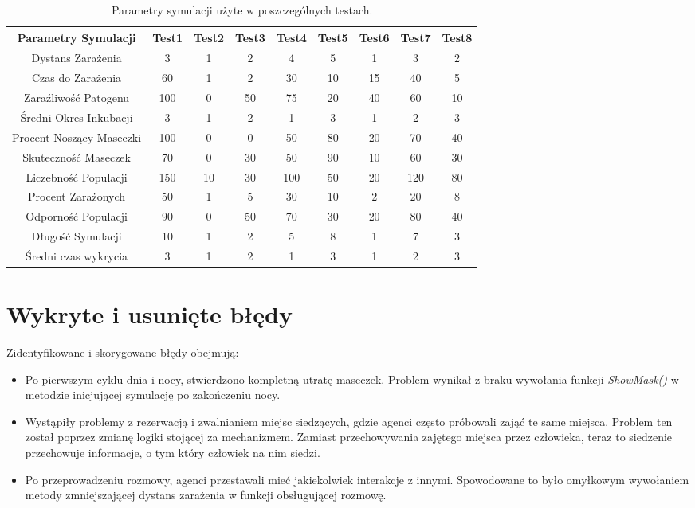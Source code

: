 \begin{table}[h!]
	\caption{Parametry symulacji użyte w poszczególnych testach.}
	\centering
	\begin{tabular}{|c|c|c|c|c|c|c|c|c|}
		\hline
		\textbf{Parametry Symulacji} & \textbf{Test1} & \textbf{Test2}  & \textbf{Test3}  & \textbf{Test4}  & \textbf{Test5} & \textbf{Test6} & \textbf{Test7} & \textbf{Test8}  \\
		\hline
		Dystans Zarażenia & 3 & 1 & 2 & 4 & 5 & 1 & 3 & 2\\
		\hline
		Czas do Zarażenia & 60 &  1 & 2 & 30 & 10 & 15 & 40 & 5\\
		\hline
		Zaraźliwość Patogenu & 100  & 0 & 50 & 75 & 20 & 40 & 60 & 10\\
		\hline
		Średni Okres Inkubacji & 3 & 1 & 2 & 1 & 3 & 1 & 2 & 3\\
		\hline
		Procent Noszący Maseczki & 100 & 0 & 0 & 50 & 80 & 20 & 70 & 40\\
		\hline
		Skuteczność Maseczek & 70 & 0 & 30 & 50 & 90 & 10 & 60 & 30\\
		\hline
		Liczebność Populacji & 150 & 10& 30 & 100 & 50 & 20 & 120 & 80\\
		\hline
		Procent Zarażonych & 50 & 1 & 5 & 30 & 10 & 2 & 20 & 8\\
		\hline
		Odporność Populacji & 90 & 0 & 50 & 70 & 30 & 20 & 80 & 40\\
		\hline
		Długość Symulacji & 10 & 1 & 2 & 5 & 8 & 1 & 7 & 3\\
		\hline
		Średni czas wykrycia & 3 & 1 & 2 & 1 & 3 & 1 & 2 & 3\\
		\hline
	\end{tabular}
	\label{tab:parameters}
\end{table}


\section{Wykryte i usunięte błędy}

Zidentyfikowane i skorygowane błędy obejmują:
\begin{itemize}
	\item Po pierwszym cyklu dnia i nocy, stwierdzono kompletną utratę maseczek. Problem wynikał z braku wywołania funkcji \textit{ShowMask()} w metodzie inicjującej symulację po zakończeniu nocy.
	\item Wystąpiły problemy z rezerwacją i zwalnianiem miejsc siedzących, gdzie agenci często próbowali zająć te same miejsca. Problem ten został poprzez zmianę logiki stojącej za mechanizmem. Zamiast przechowywania zajętego miejsca przez człowieka, teraz to siedzenie przechowuje informacje, o tym który człowiek na nim siedzi.
	\item Po przeprowadzeniu rozmowy, agenci przestawali mieć jakiekolwiek interakcje z innymi. Spowodowane to było omyłkowym wywołaniem metody zmniejszającej dystans zarażenia w funkcji obsługującej rozmowę.
\end{itemize}

%

